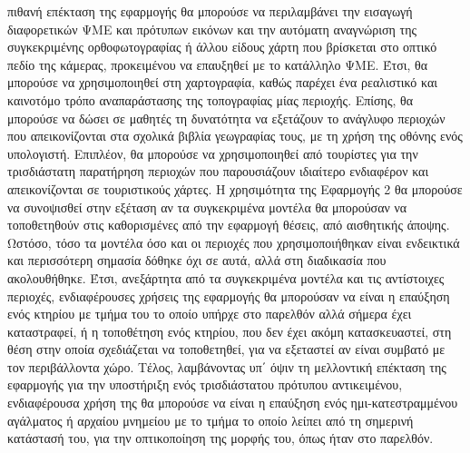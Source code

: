 πιθανή επέκταση της εφαρμογής θα μπορούσε να περιλαμβάνει την εισαγωγή διαφορετικών ΨΜΕ και πρότυπων εικόνων και την αυτόματη αναγνώριση της συγκεκριμένης ορθοφωτογραφίας ή άλλου είδους χάρτη που βρίσκεται στο οπτικό πεδίο της κάμερας, προκειμένου να επαυξηθεί με το κατάλληλο ΨΜΕ. Έτσι, θα μπορούσε να χρησιμοποιηθεί στη χαρτογραφία, καθώς παρέχει ένα ρεαλιστικό και καινοτόμο τρόπο αναπαράστασης της τοπογραφίας μίας περιοχής. Επίσης, θα μπορούσε να δώσει σε μαθητές τη δυνατότητα να εξετάζουν το ανάγλυφο περιοχών που απεικονίζονται στα σχολικά βιβλία γεωγραφίας τους, με τη χρήση της οθόνης ενός υπολογιστή. Επιπλέον, θα μπορούσε να χρησιμοποιηθεί από τουρίστες για την τρισδιάστατη παρατήρηση περιοχών που παρουσιάζουν ιδιαίτερο ενδιαφέρον και απεικονίζονται σε τουριστικούς χάρτες. Η χρησιμότητα της Εφαρμογής 2 θα μπορούσε να συνοψισθεί στην εξέταση αν τα συγκεκριμένα μοντέλα θα μπορούσαν να τοποθετηθούν στις καθορισμένες από την εφαρμογή θέσεις, από αισθητικής άποψης. Ωστόσο, τόσο τα μοντέλα όσο και οι περιοχές που χρησιμοποιήθηκαν είναι ενδεικτικά και περισσότερη σημασία δόθηκε όχι σε αυτά, αλλά στη διαδικασία που ακολουθήθηκε. Έτσι, ανεξάρτητα από τα συγκεκριμένα μοντέλα και τις αντίστοιχες περιοχές, ενδιαφέρουσες χρήσεις της εφαρμογής θα μπορούσαν να είναι η επαύξηση ενός κτηρίου με τμήμα του το οποίο υπήρχε στο παρελθόν αλλά σήμερα έχει καταστραφεί, ή η τοποθέτηση ενός κτηρίου, που δεν έχει ακόμη κατασκευαστεί, στη θέση στην οποία σχεδιάζεται να τοποθετηθεί, για να εξεταστεί αν είναι συμβατό με τον περιβάλλοντα χώρο. Τέλος, λαμβάνοντας υπ΄ όψιν τη μελλοντική επέκταση της εφαρμογής για την υποστήριξη ενός τρισδιάστατου πρότυπου αντικειμένου, ενδιαφέρουσα χρήση της θα μπορούσε να είναι η επαύξηση ενός ημι-κατεστραμμένου αγάλματος ή αρχαίου μνημείου με το τμήμα το οποίο λείπει από τη σημερινή κατάστασή του, για την οπτικοποίηση της μορφής του, όπως ήταν στο παρελθόν.


